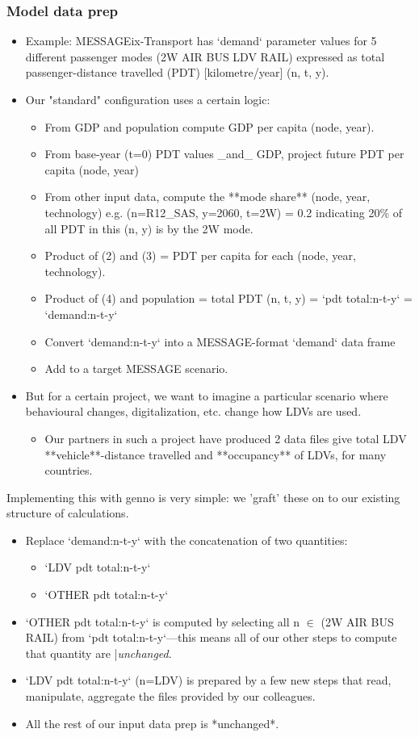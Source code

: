\documentclass[12pt,aspectratio=169]{beamer}
\begin{document}
\begin{frame}[allowframebreaks]
\frametitle{Model data prep}
\begin{itemize}
  \item Example: MESSAGEix-Transport has `demand` parameter values for 5 different passenger modes (2W AIR BUS LDV RAIL) expressed as total passenger-distance travelled (PDT) [kilometre/year] (n, t, y).
  \item Our "standard" configuration uses a certain logic:
    \begin{itemize}
      \item From GDP and population compute GDP per capita (node, year).
      \item From base-year (t=0) PDT values _and_ GDP, project future PDT per capita (node, year)
      \item From other input data, compute the **mode share** (node, year, technology) e.g. (n=R12_SAS, y=2060, t=2W) = 0.2 indicating 20\% of all PDT in this (n, y) is by the 2W mode.
      \item Product of (2) and (3) = PDT per capita for each (node, year, technology).
      \item Product of (4) and population = total PDT (n, t, y) = `pdt total:n-t-y` = `demand:n-t-y`
      \item Convert `demand:n-t-y` into a MESSAGE-format `demand` data frame
      \item Add to a target MESSAGE scenario.
    \end{itemize}
  \item But for a certain project, we want to imagine a particular scenario where behavioural changes, digitalization, etc. change how LDVs are used.
    \begin{itemize}
      \item Our partners in such a project have produced 2 data files give total LDV **vehicle**-distance travelled and **occupancy** of LDVs, for many countries.
    \end{itemize}
\end{itemize}

Implementing this with genno is very simple: we 'graft' these on to our existing structure of calculations.
\begin{itemize}
  \item Replace `demand:n-t-y` with the concatenation of two quantities:
    \begin{itemize}
      \item `LDV pdt total:n-t-y`
      \item `OTHER pdt total:n-t-y`
    \end{itemize}
  \item `OTHER pdt total:n-t-y` is computed by selecting all n $\in$ (2W AIR BUS RAIL) from `pdt total:n-t-y`—this means all of our other steps to compute that quantity are |\emph{unchanged}.
  \item `LDV pdt total:n-t-y` (n=LDV) is prepared by a few new steps that read, manipulate, aggregate the files provided by our colleagues.
  \item All the rest of our input data prep is *unchanged*.
\end{itemize}


\end{frame}
\end{document}
